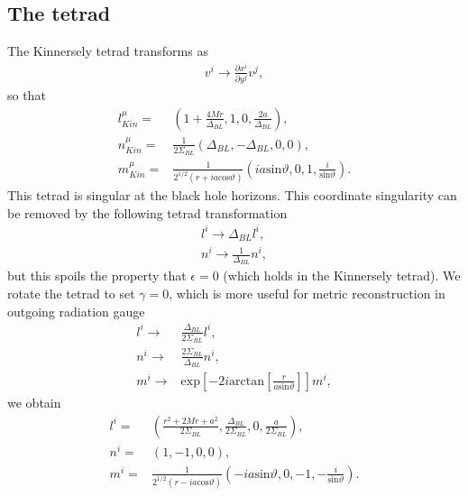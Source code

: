 \documentclass[12pt]{report}
\begin{document}
\subsection{The tetrad}
	The Kinnersely tetrad transforms as
\begin{align}
	v^i\to \frac{\partial x^i}{\partial y^j}v^j
	,
\end{align}
	so that
\begin{subequations}
\label{eq:Kinnersley_tetrad_IEF}
\begin{align}
	l_{Kin}^{\mu}
	= &
	\left(
		1+\frac{4Mr}{\Delta_{BL}},
		1,
		0,
		\frac{2a}{\Delta_{BL}}
	\right)
	, \\
	n_{Kin}^{\mu}
	= &
	\frac{1}{2\Sigma_{BL}}\left(
		\Delta_{BL},
		-\Delta_{BL},
		0,
		0
	\right)
	, \\
	m_{Kin}^{\mu}
	= &
	\frac{1}{2^{1/2}\left(r+ia\mathrm{cos}\vartheta\right)}
	\left(
		ia\mathrm{sin}\vartheta,0,1,\frac{i}{\mathrm{sin}\vartheta}
	\right)
	.
\end{align}
\end{subequations}
	This tetrad is singular at the black hole horizons.
This coordinate singularity
can be removed by the following tetrad transformation \cite{Teukolsky:1973ha}
\begin{subequations}
\begin{align}
	l^i\to \Delta_{BL}l^i, \\
	n^i\to \frac{1}{\Delta_{BL}}n^i
	,
\end{align}
\end{subequations} 
	but this spoils the property that $\epsilon=0$ (which holds in
the Kinnersely tetrad). We rotate the tetrad to set $\gamma=0$, which
is more useful for metric reconstruction in outgoing radiation gauge
\begin{subequations}
\begin{align}
	l^i
	\to &
	\frac{\Delta_{BL}}{2\Sigma_{BL}}l^i
	, \\
	n^i
	\to &
	\frac{2\Sigma_{BL}}{\Delta_{BL}}n^i
	, \\
	m^i
	\to &
	\mathrm{exp}\left[-2i\mathrm{arctan}\left[\frac{r}{a\mathrm{sin}\vartheta}\right]\right]m^i
	,
\end{align}
\end{subequations}
	we obtain
\begin{subequations}
\label{eq:new_tetrad_EF}
\begin{align}
	l^i
	= &
	\left(
		\frac{r^2+2Mr+a^2}{2\Sigma_{BL}},
		\frac{\Delta_{BL}}{2\Sigma_{BL}},
		0,
		\frac{a}{2\Sigma_{BL}}
	\right)
	, \\
	n^i
	= &
	\left(
		1,-1,0,0
	\right)
	, \\
	m^i
	= &
	\frac{1}{2^{1/2}\left(r-ia\mathrm{cos}\vartheta\right)}
	\left(
		-ia\mathrm{sin}\vartheta,0,-1,-\frac{i}{\mathrm{sin}\vartheta}
	\right)
	.
\end{align}
\end{subequations}
\end{document}

